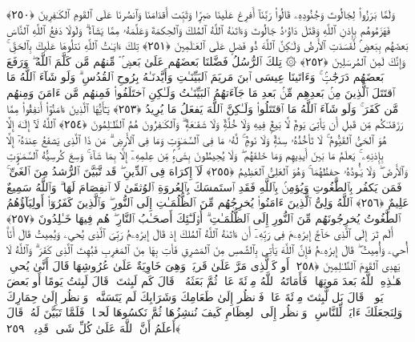  وَلَمَّا بَرَزُوا۟ لِجَالُوتَ وَجُنُودِهِۦ قَالُوا۟ رَبَّنَآ أَفرِغ عَلَينَا صَبرًۭا وَثَبِّت أَقدَامَنَا وَٱنصُرنَا عَلَى ٱلقَومِ ٱلكَـٰفِرِينَ ﴿٢٥٠﴾
 فَهَزَمُوهُم بِإِذنِ ٱللَّهِ وَقَتَلَ دَاوُۥدُ جَالُوتَ وَءَاتَىٰهُ ٱللَّهُ ٱلمُلكَ وَٱلحِكمَةَ وَعَلَّمَهُۥ مِمَّا يَشَآءُ ۗ وَلَولَا دَفعُ ٱللَّهِ ٱلنَّاسَ بَعضَهُم بِبَعضٍۢ لَّفَسَدَتِ ٱلأَرضُ وَلَـٰكِنَّ ٱللَّهَ ذُو فَضلٍ عَلَى ٱلعَـٰلَمِينَ ﴿٢٥١﴾
 تِلكَ ءَايَـٰتُ ٱللَّهِ نَتلُوهَا عَلَيكَ بِٱلحَقِّ ۚ وَإِنَّكَ لَمِنَ ٱلمُرسَلِينَ ﴿٢٥٢﴾
 ۞ تِلكَ ٱلرُّسُلُ فَضَّلنَا بَعضَهُم عَلَىٰ بَعضٍۢ ۘ مِّنهُم مَّن كَلَّمَ ٱللَّهُ ۖ وَرَفَعَ بَعضَهُم دَرَجَٰتٍۢ ۚ وَءَاتَينَا عِيسَى ٱبنَ مَريَمَ ٱلبَيِّنَـٰتِ وَأَيَّدنَـٰهُ بِرُوحِ ٱلقُدُسِ ۗ وَلَو شَآءَ ٱللَّهُ مَا ٱقتَتَلَ ٱلَّذِينَ مِنۢ بَعدِهِم مِّنۢ بَعدِ مَا جَآءَتهُمُ ٱلبَيِّنَـٰتُ وَلَـٰكِنِ ٱختَلَفُوا۟ فَمِنهُم مَّن ءَامَنَ وَمِنهُم مَّن كَفَرَ ۚ وَلَو شَآءَ ٱللَّهُ مَا ٱقتَتَلُوا۟ وَلَـٰكِنَّ ٱللَّهَ يَفعَلُ مَا يُرِيدُ ﴿٢٥٣﴾
 يَـٰٓأَيُّهَا ٱلَّذِينَ ءَامَنُوٓا۟ أَنفِقُوا۟ مِمَّا رَزَقنَـٰكُم مِّن قَبلِ أَن يَأتِىَ يَومٌۭ لَّا بَيعٌۭ فِيهِ وَلَا خُلَّةٌۭ وَلَا شَفَـٰعَةٌۭ ۗ وَٱلكَـٰفِرُونَ هُمُ ٱلظَّـٰلِمُونَ ﴿٢٥٤﴾
 ٱللَّهُ لَآ إِلَـٰهَ إِلَّا هُوَ ٱلحَىُّ ٱلقَيُّومُ ۚ لَا تَأخُذُهُۥ سِنَةٌۭ وَلَا نَومٌۭ ۚ لَّهُۥ مَا فِى ٱلسَّمَـٰوَٟتِ وَمَا فِى ٱلأَرضِ ۗ مَن ذَا ٱلَّذِى يَشفَعُ عِندَهُۥٓ إِلَّا بِإِذنِهِۦ ۚ يَعلَمُ مَا بَينَ أَيدِيهِم وَمَا خَلفَهُم ۖ وَلَا يُحِيطُونَ بِشَىءٍۢ مِّن عِلمِهِۦٓ إِلَّا بِمَا شَآءَ ۚ وَسِعَ كُرسِيُّهُ ٱلسَّمَـٰوَٟتِ وَٱلأَرضَ ۖ وَلَا يَـُٔودُهُۥ حِفظُهُمَا ۚ وَهُوَ ٱلعَلِىُّ ٱلعَظِيمُ ﴿٢٥٥﴾
 لَآ إِكرَاهَ فِى ٱلدِّينِ ۖ قَد تَّبَيَّنَ ٱلرُّشدُ مِنَ ٱلغَىِّ ۚ فَمَن يَكفُر بِٱلطَّٰغُوتِ وَيُؤمِنۢ بِٱللَّهِ فَقَدِ ٱستَمسَكَ بِٱلعُروَةِ ٱلوُثقَىٰ لَا ٱنفِصَامَ لَهَا ۗ وَٱللَّهُ سَمِيعٌ عَلِيمٌ ﴿٢٥٦﴾
 ٱللَّهُ وَلِىُّ ٱلَّذِينَ ءَامَنُوا۟ يُخرِجُهُم مِّنَ ٱلظُّلُمَـٰتِ إِلَى ٱلنُّورِ ۖ وَٱلَّذِينَ كَفَرُوٓا۟ أَولِيَآؤُهُمُ ٱلطَّٰغُوتُ يُخرِجُونَهُم مِّنَ ٱلنُّورِ إِلَى ٱلظُّلُمَـٰتِ ۗ أُو۟لَـٰٓئِكَ أَصحَـٰبُ ٱلنَّارِ ۖ هُم فِيهَا خَـٰلِدُونَ ﴿٢٥٧﴾
 أَلَم تَرَ إِلَى ٱلَّذِى حَآجَّ إِبرَٰهِۦمَ فِى رَبِّهِۦٓ أَن ءَاتَىٰهُ ٱللَّهُ ٱلمُلكَ إِذ قَالَ إِبرَٰهِۦمُ رَبِّىَ ٱلَّذِى يُحىِۦ وَيُمِيتُ قَالَ أَنَا۠ أُحىِۦ وَأُمِيتُ ۖ قَالَ إِبرَٰهِۦمُ فَإِنَّ ٱللَّهَ يَأتِى بِٱلشَّمسِ مِنَ ٱلمَشرِقِ فَأتِ بِهَا مِنَ ٱلمَغرِبِ فَبُهِتَ ٱلَّذِى كَفَرَ ۗ وَٱللَّهُ لَا يَهدِى ٱلقَومَ ٱلظَّـٰلِمِينَ ﴿٢٥٨﴾
 أَو كَٱلَّذِى مَرَّ عَلَىٰ قَريَةٍۢ وَهِىَ خَاوِيَةٌ عَلَىٰ عُرُوشِهَا قَالَ أَنَّىٰ يُحىِۦ هَـٰذِهِ ٱللَّهُ بَعدَ مَوتِهَا ۖ فَأَمَاتَهُ ٱللَّهُ مِا۟ئَةَ عَامٍۢ ثُمَّ بَعَثَهُۥ ۖ قَالَ كَم لَبِثتَ ۖ قَالَ لَبِثتُ يَومًا أَو بَعضَ يَومٍۢ ۖ قَالَ بَل لَّبِثتَ مِا۟ئَةَ عَامٍۢ فَٱنظُر إِلَىٰ طَعَامِكَ وَشَرَابِكَ لَم يَتَسَنَّه ۖ وَٱنظُر إِلَىٰ حِمَارِكَ وَلِنَجعَلَكَ ءَايَةًۭ لِّلنَّاسِ ۖ وَٱنظُر إِلَى ٱلعِظَامِ كَيفَ نُنشِزُهَا ثُمَّ نَكسُوهَا لَحمًۭا ۚ فَلَمَّا تَبَيَّنَ لَهُۥ قَالَ أَعلَمُ أَنَّ ٱللَّهَ عَلَىٰ كُلِّ شَىءٍۢ قَدِيرٌۭ ﴿٢٥٩﴾
